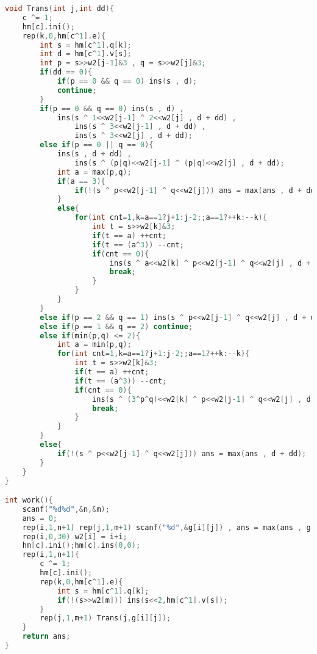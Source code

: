 \begin{lstlisting}[language=C++]
void Trans(int j,int dd){
    c ^= 1;
    hm[c].ini();
    rep(k,0,hm[c^1].e){
        int s = hm[c^1].q[k];
        int d = hm[c^1].v[s];
        int p = s>>w2[j-1]&3 , q = s>>w2[j]&3;
        if(dd == 0){
            if(p == 0 && q == 0) ins(s , d);
            continue;
        }
        if(p == 0 && q == 0) ins(s , d) ,
            ins(s ^ 1<<w2[j-1] ^ 2<<w2[j] , d + dd) ,
                ins(s ^ 3<<w2[j-1] , d + dd) ,
                ins(s ^ 3<<w2[j] , d + dd);
        else if(p == 0 || q == 0){
            ins(s , d + dd) ,
                ins(s ^ (p|q)<<w2[j-1] ^ (p|q)<<w2[j] , d + dd);
            int a = max(p,q);
            if(a == 3){
                if(!(s ^ p<<w2[j-1] ^ q<<w2[j])) ans = max(ans , d + dd);
            }
            else{
                for(int cnt=1,k=a==1?j+1:j-2;;a==1?++k:--k){
                    int t = s>>w2[k]&3;
                    if(t == a) ++cnt;
                    if(t == (a^3)) --cnt;
                    if(cnt == 0){
                        ins(s ^ a<<w2[k] ^ p<<w2[j-1] ^ q<<w2[j] , d + dd);
                        break;
                    }
                }
            }
        }
        else if(p == 2 && q == 1) ins(s ^ p<<w2[j-1] ^ q<<w2[j] , d + dd);
        else if(p == 1 && q == 2) continue;
        else if(min(p,q) <= 2){
            int a = min(p,q);
            for(int cnt=1,k=a==1?j+1:j-2;;a==1?++k:--k){
                int t = s>>w2[k]&3;
                if(t == a) ++cnt;
                if(t == (a^3)) --cnt;
                if(cnt == 0){
                    ins(s ^ (3^p^q)<<w2[k] ^ p<<w2[j-1] ^ q<<w2[j] , d + dd);
                    break;
                }
            }
        }
        else{
            if(!(s ^ p<<w2[j-1] ^ q<<w2[j])) ans = max(ans , d + dd);
        }
    }
}

int work(){
    scanf("%d%d",&n,&m);
    ans = 0;
    rep(i,1,n+1) rep(j,1,m+1) scanf("%d",&g[i][j]) , ans = max(ans , g[i][j]);
    rep(i,0,30) w2[i] = i+i;
    hm[c].ini();hm[c].ins(0,0);
    rep(i,1,n+1){
        c ^= 1;
        hm[c].ini();
        rep(k,0,hm[c^1].e){
            int s = hm[c^1].q[k];
            if(!(s>>w2[m])) ins(s<<2,hm[c^1].v[s]);
        }
        rep(j,1,m+1) Trans(j,g[i][j]);
    }
    return ans;
}


\end{lstlisting}
